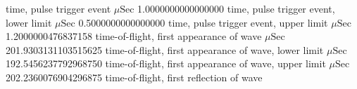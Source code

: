 \expandafter\def\csname oct2tex.air_d70_v800_P.t0.d\endcsname{time, pulse trigger event}
\expandafter\def\csname oct2tex.air_d70_v800_P.t0.u\endcsname{\ensuremath{\mu\text{Sec}}}
\expandafter\def\csname oct2tex.air_d70_v800_P.t0.v\endcsname{1.0000000000000000}
\expandafter\def\csname oct2tex.air_d70_v800_P.t0a.d\endcsname{time, pulse trigger event, lower limit}
\expandafter\def\csname oct2tex.air_d70_v800_P.t0a.u\endcsname{\ensuremath{\mu\text{Sec}}}
\expandafter\def\csname oct2tex.air_d70_v800_P.t0a.v\endcsname{0.5000000000000000}
\expandafter\def\csname oct2tex.air_d70_v800_P.t0b.d\endcsname{time, pulse trigger event, upper limit}
\expandafter\def\csname oct2tex.air_d70_v800_P.t0b.u\endcsname{\ensuremath{\mu\text{Sec}}}
\expandafter\def\csname oct2tex.air_d70_v800_P.t0b.v\endcsname{1.2000000476837158}
\expandafter\def\csname oct2tex.air_d70_v800_P.t1.d\endcsname{time-of-flight, first appearance of wave}
\expandafter\def\csname oct2tex.air_d70_v800_P.t1.u\endcsname{\ensuremath{\mu\text{Sec}}}
\expandafter\def\csname oct2tex.air_d70_v800_P.t1.v\endcsname{201.9303131103515625}
\expandafter\def\csname oct2tex.air_d70_v800_P.t1a.d\endcsname{time-of-flight, first appearance of wave, lower limit}
\expandafter\def\csname oct2tex.air_d70_v800_P.t1a.u\endcsname{\ensuremath{\mu\text{Sec}}}
\expandafter\def\csname oct2tex.air_d70_v800_P.t1a.v\endcsname{192.5456237792968750}
\expandafter\def\csname oct2tex.air_d70_v800_P.t1b.d\endcsname{time-of-flight, first appearance of wave, upper limit}
\expandafter\def\csname oct2tex.air_d70_v800_P.t1b.u\endcsname{\ensuremath{\mu\text{Sec}}}
\expandafter\def\csname oct2tex.air_d70_v800_P.t1b.v\endcsname{202.2360076904296875}
\expandafter\def\csname oct2tex.air_d70_v800_P.t2.d\endcsname{time-of-flight, first reflection of wave}
